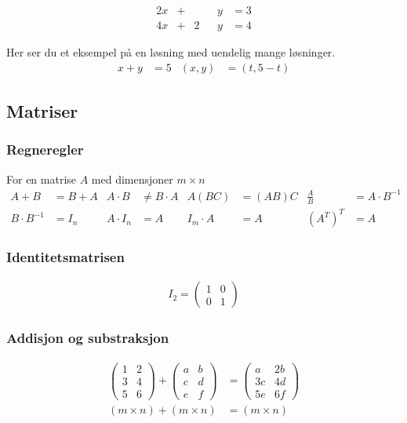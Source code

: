 \documentclass[12pt,norsk,a4paper]{article}
\begin{document}
\begin{equation*}
\begin{alignedat}{5}
2x	&+	&		&	&y	&=	3	\\
4x	&+	&	2	&	&y	&=	4
\end{alignedat}
\end{equation*}

Her ser du et eksempel på en løsning med uendelig mange løsninger.
\begin{align*}
x + y &=5	&	(x,y) &= (t, 5-t)
\end{align*}

\newpage

\subsection{Matriser}
\subsubsection*{Regneregler}
For en matrise $A$ med dimensjoner $m \times n$
\begin{align*}
A+B &= B+A	&	A \cdot B &\neq B \cdot A	&	A(BC) &= (AB)C	&	\frac{A}{B} &= A \cdot B^{-1}	\\
B \cdot B^{-1} &= I_{n}	&	A \cdot I_{n} &=  A		&	I_{m} \cdot A &= A	&	(A^{T})^{T} &= A
\end{align*}

\subsubsection*{Identitetsmatrisen}
\begin{align*}
I_{2} = 
\begin{pmatrix}
1	&	0	\\
0	&	1
\end{pmatrix}
\end{align*}

\subsubsection*{Addisjon og substraksjon}
\begin{align*}
\begin{pmatrix}
1	&	2	\\
3	&	4	\\
5	&	6
\end{pmatrix}
+
\begin{pmatrix}
a	&	b	\\
c	&	d	\\
e	&	f
\end{pmatrix}
&=
\begin{pmatrix}
a	&	2b	\\
3c	&	4d	\\
5e	&	6f
\end{pmatrix}\\
(m \times n) + (m \times n) &= (m \times n)
\end{align*}
\end{document}
